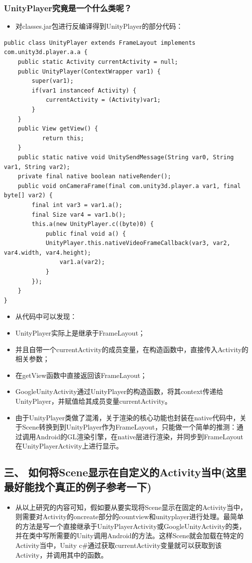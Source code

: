 \documentclass[9pt, b5paper]{article}
\begin{document}
\subsubsection{UnityPlayer究竟是一个什么类呢？}
\label{sec-1-2-4}
\begin{itemize}
\item 对classes.jar包进行反编译得到UnityPlayer的部分代码：
\end{itemize}
\begin{verbatim}
public class UnityPlayer extends FrameLayout implements com.unity3d.player.a.a {
    public static Activity currentActivity = null;
    public UnityPlayer(ContextWrapper var1) {
        super(var1);
        if(var1 instanceof Activity) {
            currentActivity = (Activity)var1;
        }
    }
    public View getView() {
           return this;
    }
    public static native void UnitySendMessage(String var0, String var1, String var2);
    private final native boolean nativeRender();
    public void onCameraFrame(final com.unity3d.player.a var1, final byte[] var2) {
        final int var3 = var1.a();
        final Size var4 = var1.b();
        this.a(new UnityPlayer.c((byte)0) {
            public final void a() {
            UnityPlayer.this.nativeVideoFrameCallback(var3, var2, var4.width, var4.height);
                var1.a(var2);
            }
        });
    }
}
\end{verbatim}
\begin{itemize}
\item 从代码中可以发现：
\item UnityPlayer实际上是继承于FrameLayout；
\item 并且自带一个currentActivity的成员变量，在构造函数中，直接传入Activity的相关参数；
\item 在getView函数中直接返回该FrameLayout；
\item GoogleUnityActivity通过UnityPlayer的构造函数，将其context传递给UnityPlayer，并赋值给其成员变量currentActivity。
\item 由于UnityPlayer类做了混淆，关于渲染的核心功能也封装在native代码中，关于Scene转换到到UnityPlayer作为FrameLayout，只能做一个简单的推测：通过调用Android的GL渲染引擎，在native层进行渲染，并同步到FrameLayout在UnityPlayerActivity上进行显示。
\end{itemize}
\subsection{三、 如何将Scene显示在自定义的Activity当中(这里最好能找个真正的例子参考一下)}
\label{sec-1-3}
\begin{itemize}
\item 从以上研究的内容可知，假如要从要实现将Scene显示在固定的Activity当中，则需要对Activity的oncreate部分的countview和unityplayer进行处理。最简单的方法是写一个直接继承于UnityPlayerActivity或GoogleUnityActivity的类，并在类中写所需要的Unity调用Android的方法。这样Scene就会加载在特定的Activity当中，Unity c\#通过获取currentActivity变量就可以获取到该Activity，并调用其中的函数。
\end{itemize}
\end{document}
